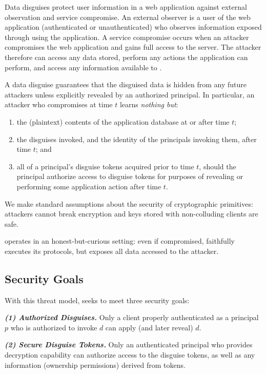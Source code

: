 %
Data disguises protect user information in a web application against external observation
and service compromise.
%
An external observer is a user of the web application (authenticated or unauthenticated) who
observes information exposed through using the application.
%
A service compromise occurs when an attacker compromises the web application and 
gains full access to the server.
%
The attacker therefore can access any data stored, perform any actions the application can
perform, and access any information available to \sys.
%

%
A data disguise guarantees that the disguised data is hidden from any future attackers unless
explicitly revealed by an authorized principal.
%
In particular, an attacker who compromises \sys at time $t$ learns \emph{nothing but}:
\begin{enumerate}[nosep]
  \item the (plaintext) contents of the application database at or after time $t$;
  \item the disguises invoked, and the identity of the principals invoking them, after time $t$; and 
  \item all of a principal's disguise tokens acquired prior to time $t$, should the principal authorize access to
      disguise tokens for purposes of revealing or performing some application action after time $t$.
\end{enumerate}
%
We make standard assumptions about the security of cryptographic primitives: attackers cannot
break encryption and keys stored with non-colluding clients are safe.
%

%
\sys operates in an honest-but-curious setting: even if compromised, \sys faithfully executes
its protocols, but exposes all data accessed to the attacker.
%

\subsection{Security Goals}
%
With this threat model, \sys seeks to meet three security goals:
%

%
\vspace{6pt}\noindent\textbf{\emph{(1) Authorized Disguises.}}
%
Only a client properly authenticated as a principal $p$ who is authorized to invoke $d$ can apply
(and later reveal) $d$.
%

\vspace{6pt}\noindent\textbf{\emph{(2) Secure Disguise Tokens.}}
%
Only an authenticated principal who provides decryption capability
 can authorize access to the disguise tokens, as well as any information
(\eg ownership permissions) derived from tokens.
%

